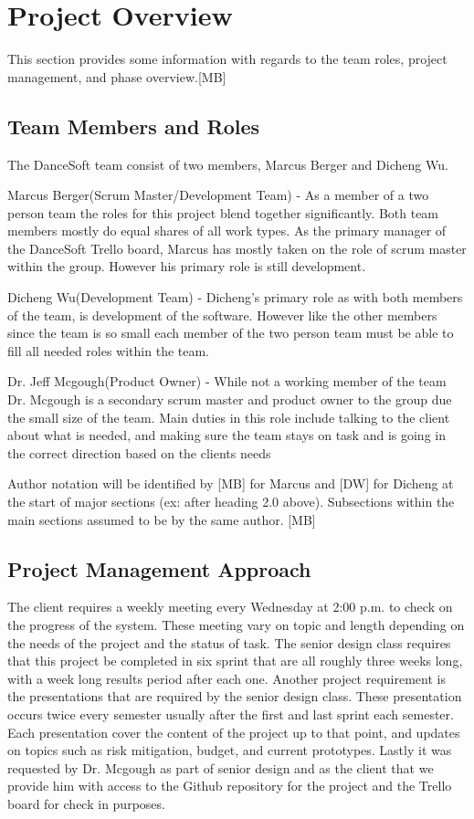 

\chapter{Project Overview}
This section provides some information with regards to the 
team roles, project management, and phase overview.[MB]

\section{Team Members and Roles}
The DanceSoft team consist of two members, Marcus Berger and Dicheng Wu.

Marcus Berger(Scrum Master/Development Team) -  As a member of a two person team the roles for this project blend together significantly. Both team members mostly do equal shares of all work types. As the primary manager of the DanceSoft Trello board, Marcus has mostly taken on the role of scrum master within the group. However his primary role is still development.

Dicheng Wu(Development Team) - Dicheng's primary role as with both members of the team, is development of the software. However like the other members since the team is so small each member of the two person team must be able to fill all needed roles within the team.

Dr. Jeff Mcgough(Product Owner) - While not a working member of the team Dr. Mcgough is a secondary scrum master and product owner to the group due the small size of the team. Main duties in this role include talking to the client about what is needed, and making sure the team stays on task and is going in the correct direction based on the clients needs 

Author notation will be identified by [MB] for Marcus and [DW] for Dicheng at the start of
major sections (ex: after heading 2.0 above). Subsections within the main sections assumed to be by the
same author. [MB] 


\section{Project  Management Approach}
The client requires a weekly meeting every Wednesday at 2:00 p.m. to check on the progress of the system. These meeting vary on topic and length depending on the needs of the project and the status of task. The senior design class requires that this project be completed in six sprint that are all roughly three weeks long, with a week long results period after each one. Another project requirement is the presentations that are required by the senior design class. These presentation occurs twice every semester usually after the first and last sprint each semester. Each presentation cover the content of the project up to that point, and updates on topics such as risk mitigation, budget, and current prototypes. Lastly it was requested by Dr. Mcgough as part of senior design and as the client that we provide him with access to the Github repository for the project and the Trello board for check in purposes.



